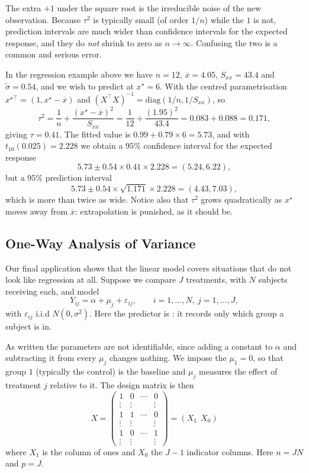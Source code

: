 The extra $+1$ under the square root is the irreducible noise of the new observation. Because $\tau^2$ is typically small (of order $1/n$) while the $1$ is not, prediction intervals are much wider than confidence intervals for the expected response, and they do \emph{not} shrink to zero as $n \to\infty$. Confusing the two is a common and serious error.

\begin{example}
  In the regression example above we have $n = 12$, $\overline x = 4.05$, $S_{xx} = 43.4$ and $\tilde\sigma = 0.54$, and we wish to predict at $x^\star = 6$. With the centred parametrisation $x^{\star\top} = (1, x^\star - \overline{x})$ and $(X^\top X)^{-1} = \mathrm{diag}(1/n, 1/S_{xx})$, so
  $$
  \tau^2 = \frac1n + \frac{(x^\star - \overline x)^2}{S_{xx}} = \frac{1}{12} + \frac{(1.95)^2}{43.4} = 0.083+0.088 = 0.171,
  $$
  giving $\tau = 0.41$. The fitted value is $0.99+0.79\times 6 = 5.73$, and with $t_{10}(0.025) = 2.228$ we obtain a $95\%$ confidence interval for the expected response
  $$
  5.73 \pm 0.54\times 0.41\times 2.228 = (5.24, 6.22),
  $$
  but a $95\%$ prediction interval
  $$
  5.73 \pm 0.54\times\sqrt{1.171}\times 2.228 = (4.43, 7.03),
  $$
  which is more than twice as wide. Notice also that $\tau^2$ grows quadratically as $x^\star$ moves away from $\overline{x}$: extrapolation is punished, as it should be.
\end{example}

\subsection{One-Way Analysis of Variance}

Our final application shows that the linear model covers situations that do not look like regression at all. Suppose we compare $J$ treatments, with $N$ subjects receiving each, and model
$$
Y_{ij} = \alpha + \mu_j + \varepsilon_{ij}, \qquad i = 1,\dots,N,\ j = 1,\dots,J,
$$
with $\varepsilon_{ij}$ i.i.d $N(0,\sigma^2)$. Here the predictor is : it records only which group a subject is in.

As written the parameters are not identifiable, since adding a constant to $\alpha$ and subtracting it from every $\mu_j$ changes nothing. We impose the  $\mu_1 = 0$, so that group $1$ (typically the control) is the baseline and $\mu_j$ measures the effect of treatment $j$ relative to it. The design matrix is then
$$
X = \begin{pmatrix}
1 & 0 &\cdots& 0\\
\vdots&\vdots& &\vdots\\
1 & 1 &\cdots& 0\\
\vdots&\vdots& &\vdots\\
1 & 0 &\cdots& 1\\
\vdots&\vdots& &\vdots
\end{pmatrix} = \left(X_1\ \ X_0\right)
$$
where $X_1$ is the column of ones and $X_0$ the $J-1$ indicator columns. Here $n = JN$ and $p = J$.

